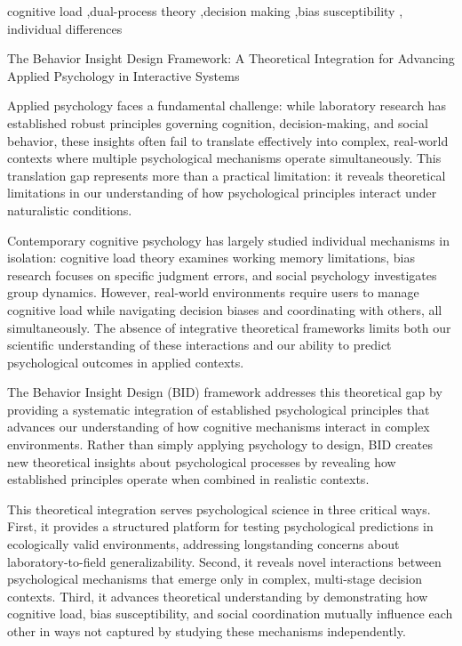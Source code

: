 \documentclass[
  authoryear,
  preprint]{elsarticle}
\begin{document}
\begin{frontmatter}
\begin{keyword}
    cognitive load \sep dual-process theory \sep decision
making \sep bias susceptibility \sep 
    individual differences
\end{keyword}
\end{frontmatter}
    

The Behavior Insight Design Framework: A Theoretical Integration for
Advancing Applied Psychology in Interactive Systems

Applied psychology faces a fundamental challenge: while laboratory
research has established robust principles governing cognition,
decision-making, and social behavior, these insights often fail to
translate effectively into complex, real-world contexts where multiple
psychological mechanisms operate simultaneously. This translation gap
represents more than a practical limitation: it reveals theoretical
limitations in our understanding of how psychological principles
interact under naturalistic conditions.

Contemporary cognitive psychology has largely studied individual
mechanisms in isolation: cognitive load theory examines working memory
limitations, bias research focuses on specific judgment errors, and
social psychology investigates group dynamics. However, real-world
environments require users to manage cognitive load while navigating
decision biases and coordinating with others, all simultaneously. The
absence of integrative theoretical frameworks limits both our scientific
understanding of these interactions and our ability to predict
psychological outcomes in applied contexts.

The Behavior Insight Design (BID) framework addresses this theoretical
gap by providing a systematic integration of established psychological
principles that advances our understanding of how cognitive mechanisms
interact in complex environments. Rather than simply applying psychology
to design, BID creates new theoretical insights about psychological
processes by revealing how established principles operate when combined
in realistic contexts.

This theoretical integration serves psychological science in three
critical ways. First, it provides a structured platform for testing
psychological predictions in ecologically valid environments, addressing
longstanding concerns about laboratory-to-field generalizability.
Second, it reveals novel interactions between psychological mechanisms
that emerge only in complex, multi-stage decision contexts. Third, it
advances theoretical understanding by demonstrating how cognitive load,
bias susceptibility, and social coordination mutually influence each
other in ways not captured by studying these mechanisms independently.
\end{document}
